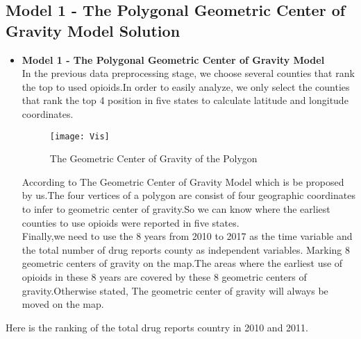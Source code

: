 \documentclass{mcmthesis}
\begin{document}
\subsection{Model 1 - The Polygonal Geometric Center of Gravity Model Solution} %
\begin{itemize}
    \item \textbf{Model 1 - The Polygonal Geometric Center of Gravity Model}\\
    In the previous data preprocessing stage, we choose several counties that rank the top to used opioids.In order to easily analyze, we only select the counties that rank the  top 4 position in five states to calculate latitude and longitude coordinates.\\
     \begin{figure}[h] %
     	\small
     	\centering
     	\texttt{[image: Vis]}
     	\caption{The Geometric Center of Gravity of the Polygon} \label{fig:Vis}
     \end{figure}
\noindent According to The Geometric Center of Gravity Model which is be proposed by us.The four vertices of a polygon are consist of four geographic coordinates to infer to geometric center of gravity.So we can know where the earliest counties to use opioids were reported in five states.\\
       
     Finally,we need to use the 8 years from 2010 to 2017 as the time variable and the total number of drug reports county as independent variables. Marking 8 geometric centers of gravity on the map.The areas where the earliest use of opioids in these 8 years are covered by these 8 geometric centers of gravity.Otherwise stated, The geometric center of gravity will always be moved on the map.\\
\end{itemize}    
\newpage
\noindent   Here is the ranking of the total drug reports country in 2010 and 2011. \\    
\end{document}
